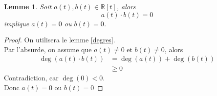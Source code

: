 \documentclass[11pt, a4paper, twoside]{article}
\newtheorem{lemma}{Lemme}
\begin{document}
\begin{lemma}\label{produit}
	Soit $a(t), b(t) \in \mathbb{R}[t]$, alors 
	\[ 
		a(t) \cdot b(t) = 0
	\]
	implique $a(t)=0$ ou $b(t)=0$.
\end{lemma}
\begin{proof}
	On utilisera le lemme \ref{degres}.\\
	Par l'absurde, on assume que $a(t) \neq 0$ et $b(t)\neq 0$, alors
	\begin{align*}
		\deg(a(t)\cdot b(t)) &= \deg(a(t)) + \deg(b(t))  \\
				 &\geq 0 
	\end{align*}
	Contradiction, car $\deg(0) < 0 $.\\
	Donc $a(t)=0$ ou $b(t)=0$
	
\end{proof}
\end{document}
